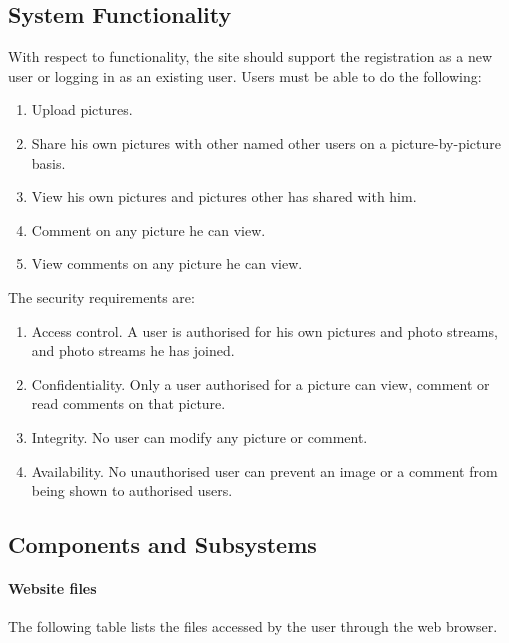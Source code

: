 \documentclass{article}
\begin{document}
\subsection{System Functionality}
With respect to functionality, the site should support the registration as a new user or logging in as an existing user. 
Users must be able to do the following:
\begin{enumerate}
\item Upload pictures. 
\item Share his own pictures with other named other users on a picture-by-picture basis.
\item View his own pictures and pictures other has shared with him.
\item Comment on any picture he can view.
\item View comments on any picture he can view.
\end{enumerate}
The security requirements are:
\begin{enumerate}
\item Access control. A user is authorised for his own pictures and photo streams, and photo streams he has joined.
\item Confidentiality. Only a user authorised for a picture can view, comment or read comments on that picture.
\item Integrity. No user can modify any picture or comment.
\item Availability. No unauthorised user can prevent an image or a comment from being shown to authorised users.
\end{enumerate}

\subsection{Components and Subsystems}

\paragraph{Website files}

The following table lists the files accessed by the user through the web browser.
\end{document}
